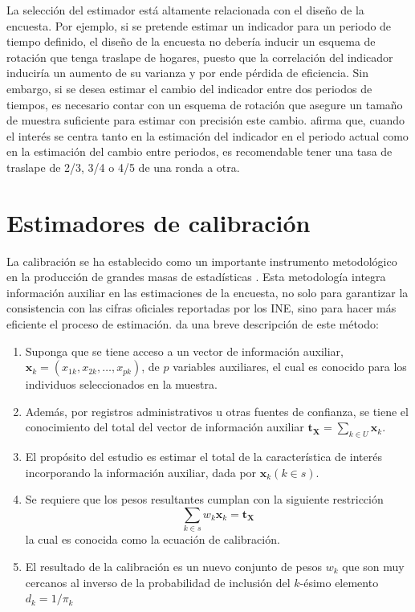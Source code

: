 \documentclass[
  12pt,
]{book}
\providecommand{\tightlist}{%
  \setlength{\itemsep}{0pt}\setlength{\parskip}{0pt}}
\begin{document}
La selección del estimador está altamente relacionada con el diseño de la encuesta. Por ejemplo, si se pretende estimar un indicador para un periodo de tiempo definido, el diseño de la encuesta no debería inducir un esquema de rotación que tenga traslape de hogares, puesto que la correlación del indicador induciría un aumento de su varianza y por ende pérdida de eficiencia. Sin embargo, si se desea estimar el cambio del indicador entre dos periodos de tiempos, es necesario contar con un esquema de rotación que asegure un tamaño de muestra suficiente para estimar con precisión este cambio. \citet[sección 12.13]{Cochran_1977} afirma que, cuando el interés se centra tanto en la estimación del indicador en el periodo actual como en la estimación del cambio entre periodos, es recomendable tener una tasa de traslape de 2/3, 3/4 o 4/5 de una ronda a otra.

\hypertarget{estimadores-de-calibraciuxf3n}{%
\section{Estimadores de calibración}\label{estimadores-de-calibraciuxf3n}}

La calibración se ha establecido como un importante instrumento metodológico en la producción de grandes masas de estadísticas \citep{Sar08}. Esta metodología integra información auxiliar en las estimaciones de la encuesta, no solo para garantizar la consistencia con las cifras oficiales reportadas por los INE, sino para hacer más eficiente el proceso de estimación. \citet{Gutierrez_2016} da una breve descripción de este método:

\begin{enumerate}
\def\labelenumi{\arabic{enumi}.}
\tightlist
\item
  Suponga que se tiene acceso a un vector de información auxiliar, \(\mathbf{x}_k=(x_{1k}, x_{2k},\ldots,x_{pk})\), de \(p\) variables auxiliares, el cual es conocido para los individuos seleccionados en la muestra.
\item
  Además, por registros administrativos u otras fuentes de confianza, se tiene el conocimiento del total del vector de información auxiliar \(\mathbf{t_X}=\sum_{k\in U}\mathbf{x}_k\).
\item
  El propósito del estudio es estimar el total de la característica de interés incorporando la información auxiliar, dada por \(\mathbf{x}_k (k\in s)\).
\item
  Se requiere que los pesos resultantes cumplan con la siguiente restricción
  \[
    \sum_{k\in s}w_k\mathbf{x}_k = \mathbf{t_X}
  \]
  la cual es conocida como la ecuación de calibración.
\item
  El resultado de la calibración es un nuevo conjunto de pesos \(w_k\) que son muy cercanos al inverso de la probabilidad de inclusión del \(k\)-ésimo elemento \(d_k=1/\pi_k\)
\end{enumerate}
\end{document}
